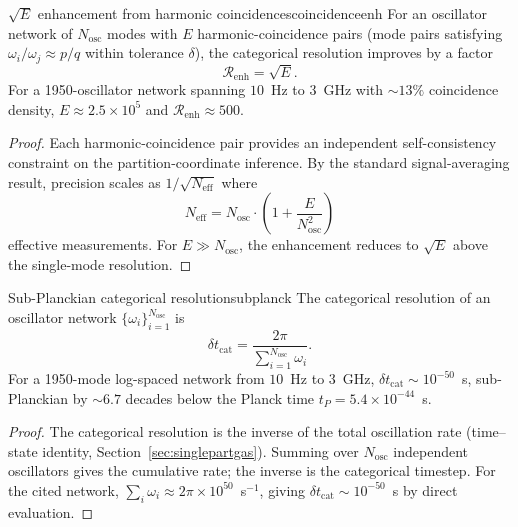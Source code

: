 \begin{consequence}{$\sqrt{E}$ enhancement from harmonic coincidences}{coincidenceenh}
For an oscillator network of $N_{\mathrm{osc}}$ modes with $E$
harmonic-coincidence pairs (mode pairs satisfying $\omega_i/\omega_j \approx
p/q$ within tolerance $\delta$), the categorical resolution improves by a
factor
\begin{equation}
  \mathcal{R}_{\mathrm{enh}} = \sqrt{E}.
  \label{eq:Renh}
\end{equation}
For a 1950-oscillator network spanning $10$~Hz to $3$~GHz with
$\sim 13\%$ coincidence density, $E \approx 2.5 \times 10^5$ and
$\mathcal{R}_{\mathrm{enh}} \approx 500$.
\end{consequence}

\begin{proof}
Each harmonic-coincidence pair provides an independent self-consistency
constraint on the partition-coordinate inference.  By the standard
signal-averaging result, precision scales as $1/\sqrt{N_{\mathrm{eff}}}$
where
\[
  N_{\mathrm{eff}}
  = N_{\mathrm{osc}} \cdot \left(1 + \frac{E}{N_{\mathrm{osc}}^2}\right)
\]
effective measurements.  For $E \gg N_{\mathrm{osc}}$, the enhancement
reduces to $\sqrt{E}$ above the single-mode resolution.
\end{proof}

\begin{consequence}{Sub-Planckian categorical resolution}{subplanck}
The categorical resolution of an oscillator network
$\{\omega_i\}_{i=1}^{N_{\mathrm{osc}}}$ is
\begin{equation}
  \delta t_{\mathrm{cat}}
  = \frac{2\pi}{\displaystyle\sum_{i=1}^{N_{\mathrm{osc}}} \omega_i}.
  \label{eq:subplanck}
\end{equation}
For a 1950-mode log-spaced network from $10$~Hz to $3$~GHz,
$\delta t_{\mathrm{cat}} \sim 10^{-50}$~s, sub-Planckian by $\sim 6.7$
decades below the Planck time $t_P = 5.4 \times 10^{-44}$~s.
\end{consequence}

\begin{proof}
The categorical resolution is the inverse of the total oscillation rate
(time--state identity, Section~\ref{sec:singlepartgas}).  Summing over
$N_{\mathrm{osc}}$ independent oscillators gives the cumulative rate; the
inverse is the categorical timestep.  For the cited network,
$\sum_i \omega_i \approx 2\pi \times 10^{50}$~s$^{-1}$, giving
$\delta t_{\mathrm{cat}} \sim 10^{-50}$~s by direct evaluation.
\end{proof}

